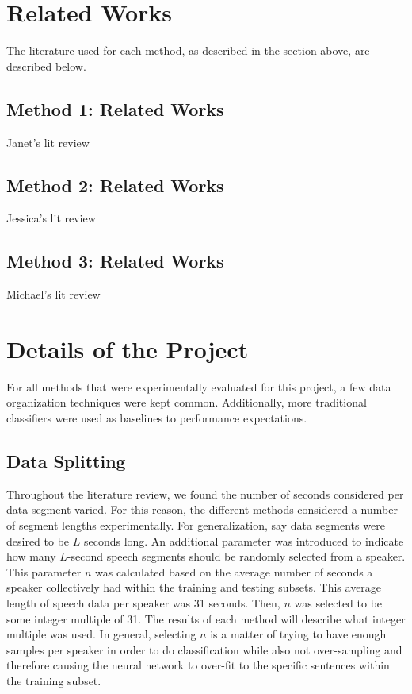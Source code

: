 \documentclass{article}
\begin{document}
\section{Related Works}
The literature used for each method, as described in the section above, are described below.
\subsection{Method 1: Related Works}
Janet's lit review
\subsection{Method 2: Related Works}
Jessica's lit review
\subsection{Method 3: Related Works}
Michael's lit review

\section{Details of the Project}
For all methods that were experimentally evaluated for this project, a few data organization techniques were kept common. 
Additionally, more traditional classifiers were used as baselines to performance expectations.
\subsection{Data Splitting}
Throughout the literature review, we found the number of seconds considered per data segment varied. 
For this reason, the different methods considered a number of segment lengths experimentally. 
For generalization, say data segments were desired to be $L$ seconds long. 
An additional parameter was introduced to indicate how many $L$-second speech segments should be randomly selected from a speaker. 
This parameter $n$ was calculated based on the average number of seconds a speaker collectively had within the training and testing subsets. 
This average length of speech data per speaker was 31 seconds. 
Then, $n$ was selected to be some integer multiple of 31. 
The results of each method will describe what integer multiple was used. 
In general, selecting $n$ is a matter of trying to have enough samples per speaker in order to do classification while also not over-sampling and therefore causing the neural network to over-fit to the specific sentences within the training subset.
\end{document}
